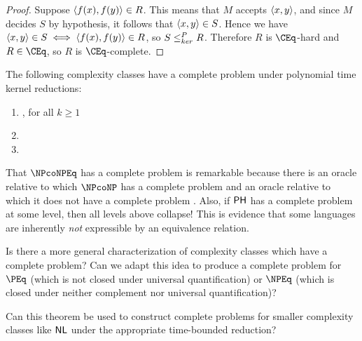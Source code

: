 \begin{proof}
  Suppose $\langle f(x),f(y)\rangle\in R$.
  This means that $M$ accepts $\langle x,y\rangle$, and since $M$ decides $S$ by hypothesis, it follows that $\langle x,y\rangle\in S$.
  Hence we have $\langle x,y\rangle\in S\iff \langle f(x),f(y)\rangle\in R$, so $S\leq^{P}_{ker} R$.
  Therefore $R$ is $\CEq$-hard and $R\in\CEq$, so $R$ is $\CEq$-complete.
\end{proof}

\begin{corollary}
  The following complexity classes have a complete problem under polynomial time kernel reductions:
  \begin{enumerate}
  \item \SKPEq, for all $k\geq 1$
  \item \PSPACEEq
  \item \PHEq
  \end{enumerate}
\end{corollary}

\begin{remark}
  That $\NPcoNPEq$ has a complete problem is remarkable because there is an oracle relative to which $\NPcoNP$ has a complete problem \cite{} and an oracle relative to which it does not have a complete problem \cite{}.
  Also, if ${\mathsf{PH}}$ has a complete problem at some level, then all levels above collapse!
  This is evidence that some languages are inherently \emph{not} expressible by an equivalence relation.
\end{remark}

\begin{openproblem}
  Is there a more general characterization of complexity classes which have a complete problem?
  Can we adapt this idea to produce a complete problem for $\PEq$ (which is not closed under universal quantification) or $\NPEq$ (which is closed under neither complement nor universal quantification)?
\end{openproblem}

\begin{openproblem}
  Can this theorem be used to construct complete problems for smaller complexity classes like ${\mathsf{NL}}$ under the appropriate time-bounded reduction?
\end{openproblem}
